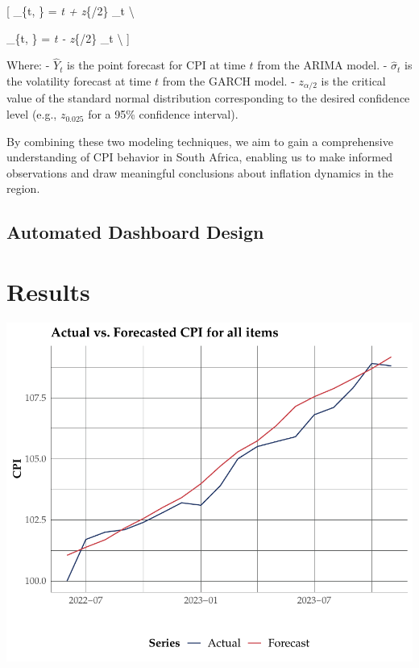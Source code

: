 \documentclass[11pt,preprint, authoryear]{elsarticle}
\numberwithin{equation}{section}
\numberwithin{figure}{section}
\numberwithin{table}{section}
\begin{document}
{[} \_\{t, \} = \emph{t + z}\{\alpha/2\}
\cdot \hat{\sigma}\_t \textbackslash{}

\_\{t, \} = \emph{t - z}\{\alpha/2\}
\cdot \hat{\sigma}\_t \textbackslash{} {]}

Where: - \(\hat{Y}_t\) is the point forecast for CPI at time \(t\) from
the ARIMA model. - \(\hat{\sigma}_t\) is the volatility forecast at time
\(t\) from the GARCH model. - \(z_{\alpha/2}\) is the critical value of
the standard normal distribution corresponding to the desired confidence
level (e.g., \(z_{0.025}\) for a 95\% confidence interval).

By combining these two modeling techniques, we aim to gain a
comprehensive understanding of CPI behavior in South Africa, enabling us
to make informed observations and draw meaningful conclusions about
inflation dynamics in the region.

\hypertarget{automated-dashboard-design}{%
\subsection{Automated Dashboard
Design}\label{automated-dashboard-design}}

\hypertarget{results}{%
\section{\texorpdfstring{Results
\label{Results}}{Results }}\label{results}}

\includegraphics{FMX-Proj-Write_Up_files/figure-latex/unnamed-chunk-2-1.pdf}
\end{document}
